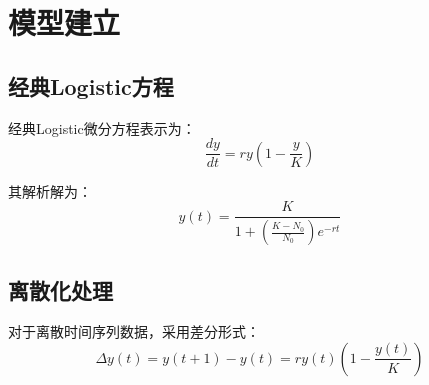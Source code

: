 \section{模型建立}

\subsection{经典Logistic方程}
经典Logistic微分方程表示为：
\begin{equation}
\frac{dy}{dt} = ry\left(1-\frac{y}{K}\right)
\end{equation}

其解析解为：
\begin{equation}
y(t) = \frac{K}{1+\left(\frac{K-N_0}{N_0}\right)e^{-rt}}
\end{equation}

\subsection{离散化处理}
对于离散时间序列数据，采用差分形式：
\begin{equation}
\Delta y(t) = y(t+1)-y(t) = ry(t)\left(1-\frac{y(t)}{K}\right)
\end{equation}
